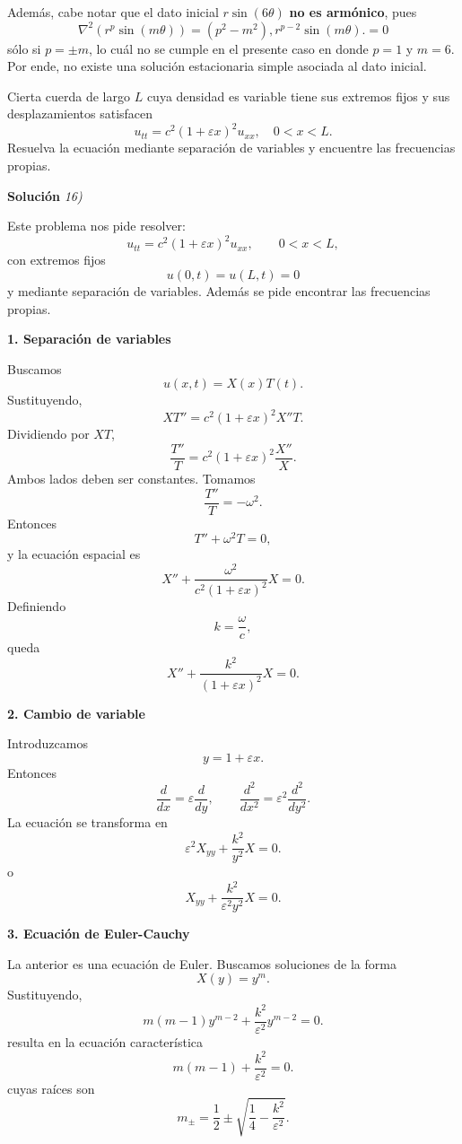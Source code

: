 \documentclass[11pt,spanish]{article}
\newcounter{problema}
\newcommand{\prob}{\stepcounter{problema} \vspace{.5cm} \noindent{\bf Problema \arabic{problema}: }}
\begin{document}
Adem\'as, cabe notar que el dato inicial $r\sin(6\theta)$ {\bf no es armónico}, pues
$$
\boxed{
\nabla^2(r^p\sin(m\theta))
=
(p^2-m^2),
r^{p-2}\sin(m\theta).
}
=
0
$$
s\'olo si $p=\pm m$, lo cuál no se cumple en el presente caso en donde $p=1$ y $m=6$.
Por ende, no existe una solución estacionaria simple asociada al dato inicial.










\prob Cierta cuerda de largo \(L\) cuya densidad es variable tiene sus extremos fijos y sus desplazamientos satisfacen
\[
u_{tt} = c^2(1+\varepsilon x)^2 u_{xx}, \quad 0<x<L.
\]
Resuelva la ecuación mediante separación de variables y encuentre las frecuencias propias.

\vspace{0.5cm}
{\bf Soluci\'on }{\em 16)}
\vspace{0.5cm}

Este problema nos pide resolver: 
$$
u_{tt}=c^2(1+\varepsilon x)^2u_{xx},
\qquad 0<x<L,
$$
con extremos fijos
$$
u(0,t)=u(L,t)=0
$$
y mediante separación de variables.
Además se pide encontrar las frecuencias propias.

{\bf 1. Separación de variables}

Buscamos
$$
u(x,t)=X(x)T(t).
$$
Sustituyendo,
$$
XT''
=
c^2(1+\varepsilon x)^2X''T.
$$
Dividiendo por $XT$,
$$
\frac{T''}{T}
=
c^2(1+\varepsilon x)^2\frac{X''}{X}.
$$
Ambos lados deben ser constantes.
Tomamos
$$
\frac{T''}{T}=-\omega^2.
$$
Entonces
$$
T''+\omega^2T=0,
$$
y la ecuación espacial es
$$
X''
+
\frac{\omega^2}{c^2(1+\varepsilon x)^2}
X
=
0.
$$
Definiendo
$$
k=\frac{\omega}{c},
$$
queda
$$
X''+\frac{k^2}{(1+\varepsilon x)^2}X=0.
$$

{\bf 2. Cambio de variable}

Introduzcamos
$$
y=1+\varepsilon x.
$$
Entonces
$$
\frac{d}{dx}
=
\varepsilon\frac{d}{dy},
\qquad
\frac{d^2}{dx^2}
=
\varepsilon^2\frac{d^2}{dy^2}.
$$
La ecuación se transforma en
$$
\varepsilon^2X_{yy}
+
\frac{k^2}{y^2}X=0.
$$
o
$$
X_{yy}
+
\frac{k^2}{\varepsilon^2y^2}X=0.
$$

{\bf 3. Ecuación de Euler-Cauchy}

La anterior es una ecuación de Euler.
Buscamos soluciones de la forma
$$
X(y)=y^m.
$$
Sustituyendo,
$$
m(m-1)y^{m-2}
+
\frac{k^2}{\varepsilon^2}y^{m-2}
=0.
$$
resulta en la ecuación característica
$$
m(m-1)
+
\frac{k^2}{\varepsilon^2}
=0.
$$
cuyas raíces son
$$
m_{\pm}
=
\frac12
\pm
\sqrt{\frac14-\frac{k^2}{\varepsilon^2}}.
$$
\end{document}
